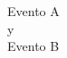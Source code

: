 \documentclass[preview]{standalone}
\begin{document}
\begin{center}
Evento A\\ y \\ Evento B
\end{center}
\end{document}
